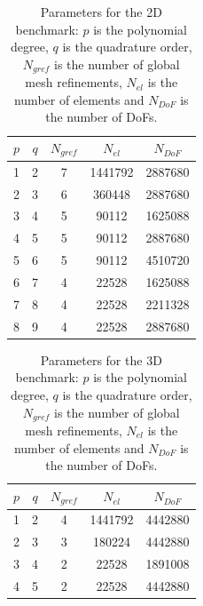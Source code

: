 \documentclass[preprint,12pt,times]{elsarticle}
\begin{document}
\begin{table}
  \centering
  \begin{tabular}{ccccc}
  \hline
    $p$ & $q$ & $N_{gref}$ & $N_{el}$ & $N_{DoF}$ \\
  \hline
    1 & 2 & 7 & 1441792 & 2887680 \\
    2 & 3 & 6 & 360448 & 2887680 \\
    3 & 4 & 5 & 90112 & 1625088 \\
    4 & 5 & 5 & 90112 & 2887680 \\
    5 & 6 & 5 & 90112 & 4510720 \\
    6 & 7 & 4 & 22528 & 1625088 \\
    7 & 8 & 4 & 22528 & 2211328 \\
    8 & 9 & 4 & 22528 & 2887680 \\
  \hline
  \end{tabular}
  \caption{Parameters for the 2D benchmark: $p$ is the polynomial degree,
  $q$ is the quadrature order, $N_{gref}$ is the number of global mesh refinements, $N_{el}$ is the number of elements and $N_{DoF}$ is the number of DoFs.
  }
  \label{tab:input_parameters_2d}
\end{table}

\begin{table}
  \centering
  \begin{tabular}{ccccc}
  \hline
    $p$ & $q$ & $N_{gref}$ & $N_{el}$ & $N_{DoF}$ \\
  \hline
    1 & 2 & 4 & 1441792 & 4442880 \\
    2 & 3 & 3 & 180224 & 4442880 \\
    3 & 4 & 2 & 22528 & 1891008 \\
    4 & 5 & 2 & 22528 & 4442880 \\
  \hline
  \end{tabular}
  \caption{Parameters for the 3D benchmark: $p$ is the polynomial degree,
  $q$ is the quadrature order, $N_{gref}$ is the number of global mesh refinements, $N_{el}$ is the number of elements and $N_{DoF}$ is the number of DoFs.
  }
  \label{tab:input_parameters_3d}
\end{table}
\end{document}
